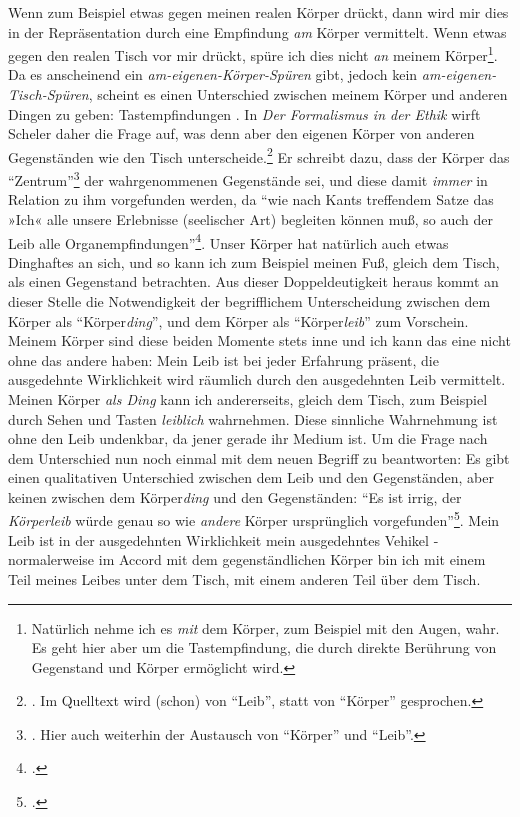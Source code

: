 \documentclass[a4paper, 12pt]{article}
\begin{document}
\begin{onehalfspace}
Wenn zum Beispiel etwas gegen meinen realen Körper drückt, dann wird mir dies in der Repräsentation durch eine Empfindung \emph{am} Körper vermittelt. Wenn etwas gegen den realen Tisch vor mir drückt, spüre ich dies nicht \emph{an} meinem Körper\footnote{Natürlich nehme ich es \emph{mit} dem Körper, zum Beispiel mit den Augen, wahr. Es geht hier aber um die Tastempfindung, die durch direkte Berührung von Gegenstand und Körper ermöglicht wird.}. Da es anscheinend ein \emph{am-eigenen-Körper-Spüren} gibt, jedoch kein \emph{am-eigenen-Tisch-Spüren}, scheint es einen Unterschied zwischen meinem Körper und anderen Dingen zu geben: Tastempfindungen . In \emph{Der Formalismus in der Ethik} wirft Scheler daher die Frage auf, was denn aber den eigenen Körper von anderen Gegenständen wie den Tisch unterscheide.\footnote{\Cite[Vgl.][S. 498]{scheler-ethik}. Im Quelltext wird (schon) von "`Leib"', statt von "`Körper"' gesprochen.} Er schreibt dazu, dass der Körper das "`Zentrum"'\footnote{\Cite[Vgl.][S. 498]{scheler-ethik}. Hier auch weiterhin der Austausch von "`Körper"' und "`Leib"'.} der wahrgenommenen Gegenstände sei, und diese damit \emph{immer} in Relation zu ihm vorgefunden werden, da "`wie nach Kants treffendem Satze das »Ich« alle unsere Erlebnisse (seelischer Art) begleiten können muß, so auch der Leib alle Organempfindungen"'\footnote{\Cite[Siehe][S. 495]{scheler-ethik}.}. Unser Körper hat natürlich auch etwas Dinghaftes an sich, und so kann ich zum Beispiel meinen Fuß, gleich dem Tisch, als einen Gegenstand betrachten. Aus dieser Doppeldeutigkeit heraus kommt an dieser Stelle die Notwendigkeit der begrifflichem Unterscheidung zwischen dem Körper als "`Körper\emph{ding}"', und dem Körper als "`Körper\emph{leib}"' zum Vorschein. Meinem Körper sind diese beiden Momente stets inne und ich kann das eine nicht ohne das andere haben: Mein Leib ist bei jeder Erfahrung präsent, die ausgedehnte Wirklichkeit wird räumlich durch den ausgedehnten Leib vermittelt. Meinen Körper \emph{als Ding} kann ich andererseits, gleich dem Tisch, zum Beispiel durch Sehen und Tasten \emph{leiblich} wahrnehmen. Diese sinnliche Wahrnehmung ist ohne den Leib undenkbar, da jener gerade ihr Medium ist. Um die Frage nach dem Unterschied nun noch einmal mit dem neuen Begriff zu beantworten: Es gibt einen qualitativen Unterschied zwischen dem Leib und den Gegenständen, aber keinen zwischen dem Körper\emph{ding} und den Gegenständen: "`Es ist irrig, der \emph{Körperleib} würde genau so wie \emph{andere} Körper ursprünglich vorgefunden"'\footnote{\Cite[Siehe][S. 494]{scheler-ethik}.}. Mein Leib ist in der ausgedehnten Wirklichkeit mein ausgedehntes Vehikel - normalerweise im Accord mit dem gegenständlichen Körper bin ich mit einem Teil meines Leibes unter dem Tisch, mit einem anderen Teil über dem Tisch. 


\end{onehalfspace}
\end{document}
